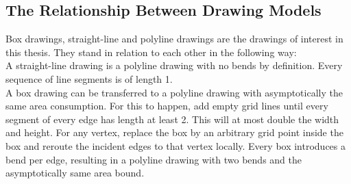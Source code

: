\subsection{The Relationship Between Drawing Models}

Box drawings, straight-line and polyline drawings are the drawings of interest in this thesis. They stand in relation to each other in the following way:\\
A straight-line drawing is a polyline drawing with no bends by definition. Every sequence of line segments is of length 1.\\
A box drawing can be transferred to a polyline drawing with asymptotically the same area consumption. For this to happen, add empty grid lines until every segment of every edge has length at least 2. This will at most double the width and height. For any vertex, replace the box by an arbitrary grid point inside the box and reroute the incident edges to that vertex locally. Every box introduces a bend per edge, resulting in a polyline drawing with two bends and the asymptotically same area bound.
\cite[P. 145]{Biedl_SP}

